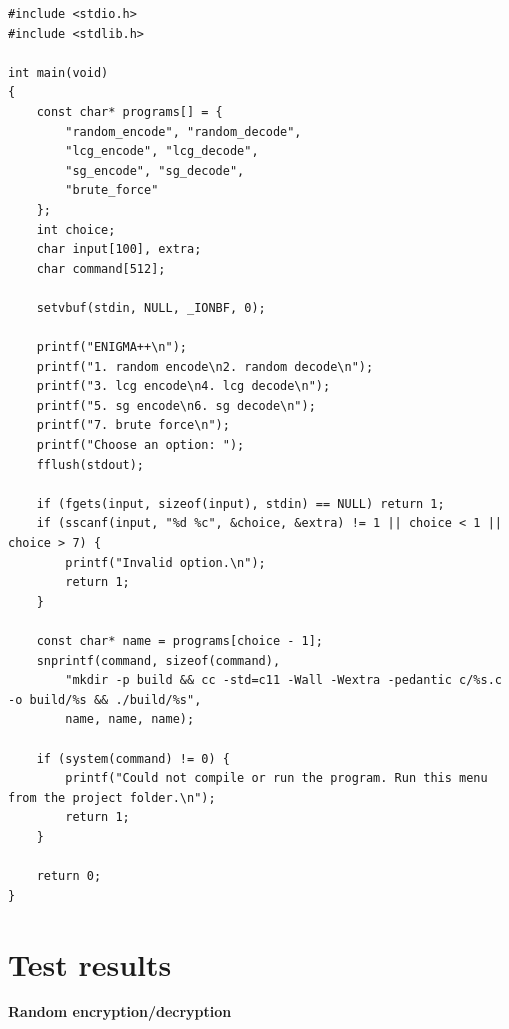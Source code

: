 \documentclass[a4paper,10pt]{article}
\begin{document}
\begin{lstlisting}[style = code, title = main.c]
#include <stdio.h>
#include <stdlib.h>

int main(void)
{
    const char* programs[] = {
        "random_encode", "random_decode",
        "lcg_encode", "lcg_decode",
        "sg_encode", "sg_decode",
        "brute_force"
    };
    int choice;
    char input[100], extra;
    char command[512];

    setvbuf(stdin, NULL, _IONBF, 0);

    printf("ENIGMA++\n");
    printf("1. random encode\n2. random decode\n");
    printf("3. lcg encode\n4. lcg decode\n");
    printf("5. sg encode\n6. sg decode\n");
    printf("7. brute force\n");
    printf("Choose an option: ");
    fflush(stdout);

    if (fgets(input, sizeof(input), stdin) == NULL) return 1;
    if (sscanf(input, "%d %c", &choice, &extra) != 1 || choice < 1 || choice > 7) {
        printf("Invalid option.\n");
        return 1;
    }

    const char* name = programs[choice - 1];
    snprintf(command, sizeof(command),
        "mkdir -p build && cc -std=c11 -Wall -Wextra -pedantic c/%s.c -o build/%s && ./build/%s",
        name, name, name);

    if (system(command) != 0) {
        printf("Could not compile or run the program. Run this menu from the project folder.\n");
        return 1;
    }

    return 0;
}
\end{lstlisting}

\section{Test results}

\textbf{Random encryption/decryption}
\end{document}
